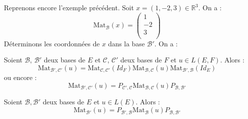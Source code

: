 \documentclass[a4paper,10pt]{report}
\begin{document}
\begin{Exemple} Reprenons encore l'exemple précédent. Soit $x=(1,-2,3) \in \mathbb{R}^3$. On a :
$$ \textrm{Mat}_{\mathcal{B}}(x) = \begin{pmatrix}
1 \\
-2 \\
3 \\
\end{pmatrix}$$
Déterminons les coordonnées de $x$ dans la base $\mathcal{B}'$. On a :

\vspace{4cm}
\end{Exemple}

\begin{Theoreme}{} Soient $\mathcal{B}$, $\mathcal{B}'$ deux bases de $E$ et $\mathcal{C}$, $\mathcal{C}'$ deux bases de $F$ et $u \in L(E,F)$. Alors :
$$ \textrm{Mat}_{\mathcal{B}', \mathcal{C}'}(u) = \textrm{Mat}_{\mathcal{C}, \mathcal{C}'}(Id_F)  \textrm{Mat}_{\mathcal{B}, \mathcal{C}}(u) \textrm{Mat}_{\mathcal{B}', \mathcal{B}}(Id_E)$$
ou encore :
$$ \textrm{Mat}_{\mathcal{B}', \mathcal{C}'}(u) = P_{\mathcal{C}', \mathcal{C}}  \textrm{Mat}_{\mathcal{B}, \mathcal{C}}(u)  P_{\mathcal{B}, \mathcal{B}'}$$
\end{Theoreme}

\begin{Corollaire}{} Soient $\mathcal{B}, \mathcal{B}'$ deux bases de $E$ et $u \in L(E)$. Alors :
$$ \textrm{Mat}_{\mathcal{B}'}(u) = P_{\mathcal{B}', \mathcal{B}}  \textrm{Mat}_{\mathcal{B}}(u)  P_{\mathcal{B}, \mathcal{B}'}$$
\end{Corollaire}
\end{document}
